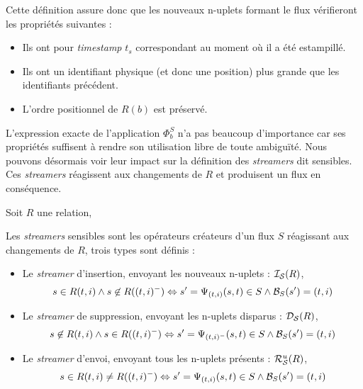 Cette définition assure donc que les nouveaux n-uplets formant le flux vérifieront les propriétés suivantes : 
\begin{itemize}
 \item Ils ont pour \textit{timestamp} $t_s$ correspondant au moment où il a été estampillé.
 \item Ils ont un identifiant physique (et donc une position) plus grande que les identifiants précédent.
 \item L'ordre positionnel de $R(b)$ est préservé.
\end{itemize}
L'expression exacte de l'application $\Phi_b^S$ n'a pas beaucoup d'importance car ses propriétés suffisent à rendre son utilisation libre de toute ambiguïté. Nous pouvons désormais voir leur impact sur la définition des \textit{streamers} dit sensibles. Ces \textit{streamers} réagissent aux changements de $R$ et produisent un flux en conséquence.
\begin{defi}
    Soit $R$ une relation,

    Les \textit{streamers} sensibles sont les opérateurs créateurs d'un flux $S$ réagissant aux changements de $R$, trois types sont définis :
\begin{itemize}
 \item Le \textit{streamer} d'insertion, envoyant les nouveaux n-uplets : $\mathcal{I_S}(R)$, $$s\in R(t,i) \wedge s\not\in R((t,i)^-) \Leftrightarrow s'=\Psi_{(t,i)}(s,t)\in S \wedge \mathcal{B}_S(s') = (t,i)$$
 \item Le \textit{streamer} de suppression, envoyant les n-uplets disparus : $\mathcal{D_S}(R)$, $$s\not\in R(t,i) \wedge s\in R((t,i)^-) \Leftrightarrow s'=\Psi_{(t,i)^-}(s,t)\in S \wedge \mathcal{B}_S(s') = (t,i)$$
 \item Le \textit{streamer} d'envoi, envoyant tous les n-uplets présents : $\mathcal{R}_{\mathcal S}^u(R)$, $$s\in R(t,i) \neq R((t,i)^-) \Leftrightarrow s'=\Psi_{(t,i)}(s,t)\in S \wedge \mathcal{B}_S(s') = (t,i)$$
\end{itemize}
\end{defi}


